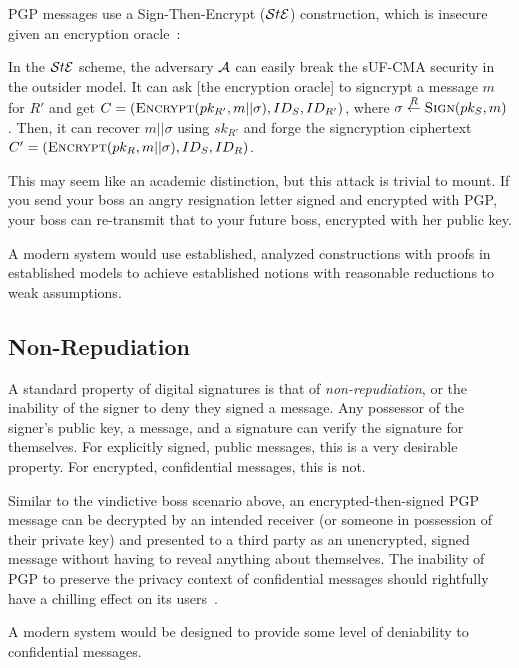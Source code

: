 PGP messages use a Sign-Then-Encrypt ($\mathcal{S}t\mathcal{E}$) construction, which is insecure given an encryption
oracle~\cite[p. 41]{an2010}\@:

\begin{displayquote}
    In the $\mathcal{S}t\mathcal{E}$ scheme, the adversary $\mathcal{A}$ can easily break the sUF-CMA security in the
    outsider model.
    It can ask \@[the encryption oracle] to signcrypt a message $m$ for $R'$ and get
    $C=(\textsc{Encrypt}(pk_{R'},m||\sigma),ID_S,ID_{R'})$, where $\sigma \stackrel{R}{\gets} \textsc{Sign}(pk_S,m)$.
    Then, it can recover $m||\sigma$ using $sk_{R'}$ and forge the signcryption ciphertext
    $C' = (\textsc{Encrypt}(pk_R,m||\sigma),ID_S,ID_R)$.
\end{displayquote}

This may seem like an academic distinction, but this attack is trivial to mount.
If you send your boss an angry resignation letter signed and encrypted with PGP, your boss can
re-transmit that to your future boss, encrypted with her public key.

A modern system would use established, analyzed constructions with proofs in established models to
achieve established notions with reasonable reductions to weak assumptions.

\subsection{Non-Repudiation}\label{subsec:non-repudiation}

A standard property of digital signatures is that of \emph{non-repudiation}\@, or the inability of
the signer to deny they signed a message.
Any possessor of the signer's public key, a message, and a signature can verify the signature for
themselves.
For explicitly signed, public messages, this is a very desirable property.
For encrypted, confidential messages, this is not.

Similar to the vindictive boss scenario above, an encrypted-then-signed PGP message can be decrypted
by an intended receiver \@(or someone in possession of their private key) and presented to a third
party as an unencrypted, signed message without having to reveal anything about themselves.
The inability of PGP to preserve the privacy context of confidential messages should rightfully have
a chilling effect on its users~\cite{borisov2004}\@.

A modern system would be designed to provide some level of deniability to confidential messages.

